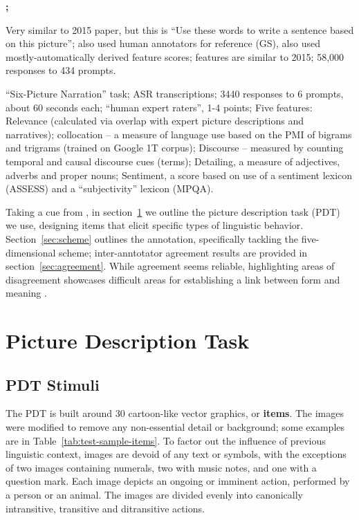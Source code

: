 \documentclass[11pt,a4paper]{article}
\begin{document}
\textbf{\citet{Meurers.Ziai.ea-11}; }

\textbf{\citet{somasundaran:chodorow:14}} Very similar to 2015 paper, but this is ``Use these words to write a sentence based on this picture''; also used human annotators for reference (GS), also used mostly-automatically derived feature scores; features are similar to 2015; 58,000 responses to 434 prompts.

\textbf{\citet{somasundaran:ea:15}} ``Six-Picture Narration'' task; ASR transcriptions; 3440 responses to 6 prompts, about 60 seconds each; ``human expert raters'', 1-4 points; Five features: Relevance (calculated via overlap with expert picture descriptions and narratives); collocation -- a measure of language use based on the PMI of bigrams and trigrams (trained on Google 1T corpus); Discourse -- measured by counting temporal and causal discourse cues (terms); Detailing, a measure of adjectives, adverbs and proper nouns; Sentiment, a score based on use of a sentiment lexicon (ASSESS) and a ``subjectivity'' lexicon (MPQA).

Taking a cue from \citet{king:dickinson:13}, in section~\ref{sec:pdt} we outline the picture description task (PDT) we use, designing items that elicit specific types of linguistic behavior.  Section~\ref{sec:scheme} outlines the annotation, specifically tackling the five-dimensional scheme; inter-anntotator agreement results are provided in section~\ref{sec:agreement}.  While agreement seems reliable, highlighting areas of disagreement showcases difficult areas for establishing a link between form and meaning \citep[cf., e.g.,][]{Meurers.Dickinson-17}.

\section{Picture Description Task}
\label{sec:pdt}

\subsection{PDT Stimuli}

The PDT is built around 30 cartoon-like vector graphics, or \textbf{items}. The images were modified to remove any non-essential detail or background; some examples are in Table~\ref{tab:test-sample-items}. To factor out the influence of previous linguistic context, images are devoid of any text or symbols, with the exceptions of two images containing numerals, two with music notes, and one with a question mark. Each image depicts an ongoing or imminent action, performed by a person or an animal. The images are divided evenly into canonically intransitive, transitive and ditransitive actions. 
\end{document}
